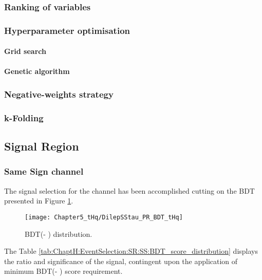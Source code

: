 \subsubsection{Ranking of variables}
\subsubsection{Hyperparameter optimisation}
\paragraph{Grid search}
\paragraph{Genetic algorithm}
\subsubsection{Negative-weights strategy}
\subsubsection{k-Folding}


\subsection{Signal Region}
\label{sec:ChaptH:EventSelection:SR}

\subsubsection{Same Sign channel}
\label{sec:ChaptH:EventSelection:SR:SS}

The signal selection for the \dilepSStau channel has been accomplished 
cutting on the BDT presented in Figure \ref{fig:ChaptH:EventSelection:SR:SS:BDT_score_distribution}.



\begin{figure}[htbp!]
\centering
\texttt{[image: Chapter5\_tHq/DilepSStau\_PR\_BDT\_tHq]}
\caption{BDT(\tHq - \dilepSStau) distribution.}
\label{fig:ChaptH:EventSelection:SR:SS:BDT_score_distribution}
\end{figure}


The Table \ref{tab:ChaptH:EventSelection:SR:SS:BDT_score_distribution} displays 
the \StoB ratio and significance of the signal, contingent upon the application of 
minimum BDT(\tHq - \dilepSStau) score requirement.


